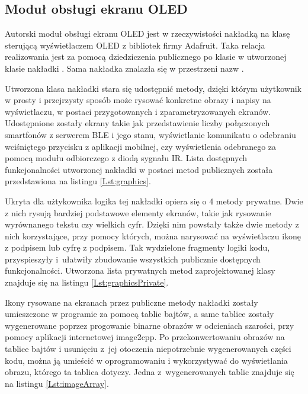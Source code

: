 \documentclass[12pt,twoside]{article}
\begin{document}
\subsection{Moduł obsługi ekranu OLED}
Autorski moduł obsługi ekranu OLED jest w rzeczywistości nakładką na klasę sterującą wyświetlaczem OLED z bibliotek firmy Adafruit. Taka relacja realizowania jest za pomocą dziedziczenia publicznego po klasie  w utworzonej klasie nakładki . Sama nakładka znalazła się w przestrzeni nazw .

Utworzona klasa nakładki stara się udostępnić metody, dzięki którym użytkownik w prosty i przejrzysty sposób może rysować konkretne obrazy i napisy na wyświetlaczu, w postaci przygotowanych i zparametryzowanych ekranów. Udostępnione zostały ekrany takie jak przedstawienie liczby połączonych smartfonów z serwerem BLE i jego stanu, wyświetlanie komunikatu o odebraniu wciśniętego przycisku z aplikacji mobilnej, czy wyświetlenia odebranego za pomocą modułu odbiorczego z diodą sygnału IR. Lista dostępnych funkcjonalności utworzonej nakładki w postaci metod publicznych została przedstawiona na listingu \ref*{Lst:graphics}.



Ukryta dla użtykownika logika tej nakładki opiera się o 4 metody prywatne. Dwie z nich rysują bardziej podstawowe elementy ekranów, takie jak rysowanie wyrównanego tekstu czy wielkich cyfr. Dzięki nim powstały także dwie metody z nich korzystające, przy pomocy których, można narysować na wyświetlaczu ikonę z podpisem lub cyfrę z podpisem. Tak wydzielone fragmenty logiki kodu, przyspieszyły i~ułatwiły zbudowanie wszystkich publicznie dostępnych funkcjonalności. Utworzona lista prywatnych metod zaprojektowanej klasy znajduje się na listingu \ref*{Lst:graphicsPrivate}.



Ikony rysowane na ekranach przez publiczne metody nakładki zostały umieszczone w programie za pomocą tablic bajtów, a same tablice zostały wygenerowane poprzez progowanie binarne obrazów w odcieniach szarości, przy pomocy aplikacji internetowej image2cpp\cite{image2cpp}. Po przekonwertowaniu obrazów na tablice bajtów i usunięciu z~jej otoczenia niepotrzebnie wygenerowanych części kodu, można ją umieścić w oprogramowaniu i wykorzystywać do wyświetlania obrazu, którego ta tablica dotyczy. Jedna z~wygenerowanych tablic znajduje się na listingu \ref*{Lst:imageArray}.
\vfill
\end{document}

